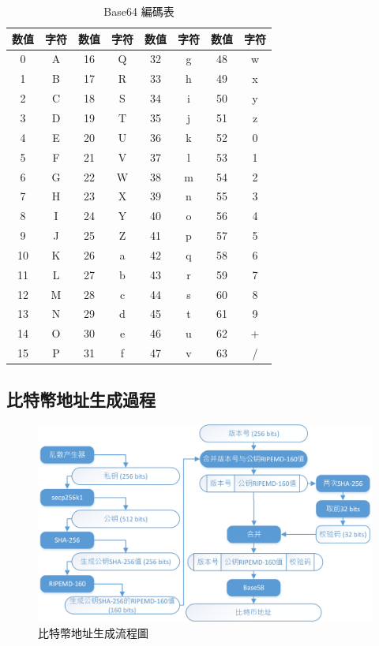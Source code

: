 					\begin{table}[htbp]
					\centering
					\caption{Base64 編碼表}
					\label{Base64}
					\begin{tabular}{|c|c|c|c|c|c|c|c|}
					\hline
					数值 & 字符 & 数值 & 字符 & 数值 & 字符 & 数值 & 字符 \\ \hline
					0 & A & 16 & Q & 32 & g & 48 & w \\ \hline
					1 & B & 17 & R & 33 & h & 49 & x \\ \hline
					2 & C & 18 & S & 34 & i & 50 & y \\ \hline
					3 & D & 19 & T & 35 & j & 51 & z \\ \hline
					4 & E & 20 & U & 36 & k & 52 & 0 \\ \hline
					5 & F & 21 & V & 37 & l & 53 & 1 \\ \hline
					6 & G & 22 & W & 38 & m & 54 & 2 \\ \hline
					7 & H & 23 & X & 39 & n & 55 & 3 \\ \hline
					8 & I & 24 & Y & 40 & o & 56 & 4 \\ \hline
					9 & J & 25 & Z & 41 & p & 57 & 5 \\ \hline
					10 & K & 26 & a & 42 & q & 58 & 6 \\ \hline
					11 & L & 27 & b & 43 & r & 59 & 7 \\ \hline
					12 & M & 28 & c & 44 & s & 60 & 8 \\ \hline
					13 & N & 29 & d & 45 & t & 61 & 9 \\ \hline
					14 & O & 30 & e & 46 & u & 62 & + \\ \hline
					15 & P & 31 & f & 47 & v & 63 & / \\ \hline
					\end{tabular}
					\end{table}

			\subsection{比特幣地址生成過程}

			\begin{figure}[htbp]
					\centering
					\includegraphics[width = .9\textwidth]{address.png}
					\caption{比特幣地址生成流程圖}\label{address}
			\end{figure}

